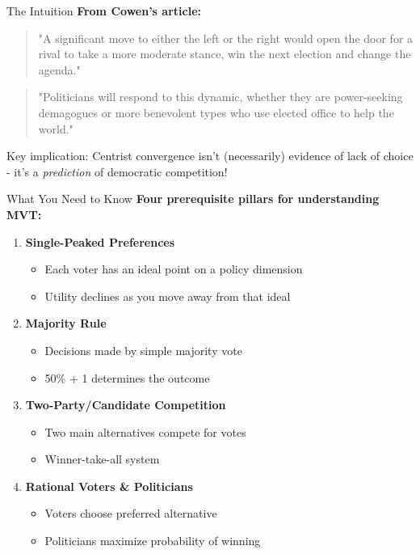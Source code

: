 \documentclass[10pt]{beamer}
\begin{document}
\begin{frame}{The Intuition}
\textbf{From Cowen's article:}


\begin{quote}
"A significant move to either the left or the right would open the door for a rival to take a more moderate stance, win the next election and change the agenda."
\end{quote}



\begin{quote}
"Politicians will respond to this dynamic, whether they are power-seeking demagogues or more benevolent types who use elected office to help the world."
\end{quote}



\alert{Key implication:} Centrist convergence isn't (necessarily) evidence of lack of choice - it's a \textit{prediction} of democratic competition!
\end{frame}

\begin{frame}{What You Need to Know}
\textbf{Four prerequisite pillars for understanding MVT:}

\begin{enumerate}
\item \textbf{Single-Peaked Preferences}
\begin{itemize}
\item Each voter has an ideal point on a policy dimension
\item Utility declines as you move away from that ideal
\end{itemize}


\item \textbf{Majority Rule}
\begin{itemize}
\item Decisions made by simple majority vote
\item 50\% + 1 determines the outcome
\end{itemize}


\item \textbf{Two-Party/Candidate Competition}
\begin{itemize}
\item Two main alternatives compete for votes
\item Winner-take-all system
\end{itemize}


\item \textbf{Rational Voters \& Politicians}
\begin{itemize}
\item Voters choose preferred alternative
\item Politicians maximize probability of winning
\end{itemize}
\end{enumerate}
\end{frame}
\end{document}
